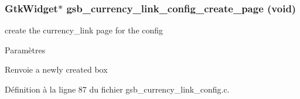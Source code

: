 \subsubsection[{gsb\_\-currency\_\-link\_\-config\_\-create\_\-page}]{\setlength{\rightskip}{0pt plus 5cm}GtkWidget$\ast$ gsb\_\-currency\_\-link\_\-config\_\-create\_\-page (void)}\label{gsb__currency__link__config_8c_ae256efc27c512e121dafe219352b4767}
create the currency\_\-link page for the config


\begin{DoxyParams}{Paramètres}
\item[{\em }]\end{DoxyParams}
\begin{DoxyReturn}{Renvoie}
a newly created box 
\end{DoxyReturn}


Définition à la ligne 87 du fichier gsb\_\-currency\_\-link\_\-config.c.

